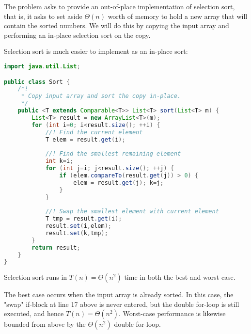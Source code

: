 \documentclass[a4paper,12pt]{article}
\begin{document}

The problem asks to provide an out-of-place implementation of selection sort, that is, it asks to set aside  
 $\Theta(n)$ worth of memory to hold a new array that will contain the sorted numbers. We will do this by 
 copying the input array and performing an in-place selection sort on the copy.
 
 Selection sort is much easier to implement as an in-place sort:

\begin{lstlisting}[language=Java]
import java.util.List;

public class Sort {
	/*!
	 * Copy input array and sort the copy in-place.
	 */
	public <T extends Comparable<T>> List<T> sort(List<T> m) {
		List<T> result = new ArrayList<T>(m);
		for (int i=0; i<result.size(); ++i) {
			//! Find the current element
			T elem = result.get(i);
			
			//! Find the smallest remaining element
			int k=i;
			for (int j=i; j<result.size(); ++j) {
				if (elem.compareTo(result.get(j)) > 0) {
					elem = result.get(j); k=j;
				}
			}
			
			//! Swap the smallest element with current element
			T tmp = result.get(i);
			result.set(i,elem);
			result.set(k,tmp);
		}
		return result;
	}
}
\end{lstlisting}

Selection sort runs in $T(n) = \Theta(n^2)$ time in both the best and worst case.

The best case occurs when the input array is already sorted. In this case, the "swap" 
if-block at line 17 above is never entered, but the double for-loop is still executed, and hence $T(n) = \Theta(n^2)$.
Worst-case performance is likewise bounded from above by the $\Theta(n^2)$ double for-loop.
\end{document}
